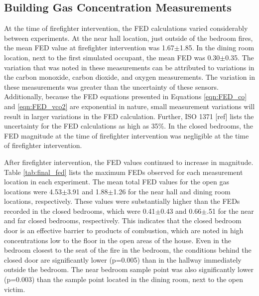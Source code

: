 \documentclass[12pt,oneside]{article}
\begin{document}
\subsection{Building Gas Concentration Measurements}
\label{subsec:gas}
At the time of firefighter intervention, the FED calculations varied considerably between experiments. At the near hall location, just outside of the bedroom fires,  the mean FED value at firefighter intervention was 1.67$\pm$1.85. In the dining room location, next to the first simulated occupant, the mean FED was 0.30$\pm$0.35. The variation that was noted in these measurements can be attributed to variations in the carbon monoxide, carbon dioxide, and oxygen measurements. The variation in these measurements was greater than the uncertainty of these sensors. Additionally, because the FED equations presented in Equations \ref{eqn:FED_co} and \ref{eqn:FED_vco2} are exponential in nature, small measurement variations will result in larger variations in the FED calculation. Further, ISO 1371 [ref] lists the uncertainty for the FED calculations as high as 35\%. In the closed bedrooms, the FED magnitude at the time of firefighter intervention was negligible at the time of firefighter intervention. 

After firefighter intervention, the FED values continued to increase in magnitude. Table \ref{tab:final_fed} lists the maximum FEDs observed for each measurement location in each experiment. The mean total FED values for the open gas locations were 4.53$\pm$3.91 and 1.88$\pm$1.26 for the near hall and dining room locations, respectively. These values were substantially higher than the FEDs recorded in the closed bedrooms, which were 0.41$\pm$0.43 and 0.66$\pm$.51 for the near and far closed bedrooms, respectively. This indicates that the closed bedroom door is an effective barrier to products of combustion, which are noted in high concentrations low to the floor in the open areas of the house. Even in the bedroom closest to the seat of the fire in the bedroom, the conditions behind the closed door are significantly lower (p=0.005) than in the hallway immediately outside the bedroom. The near bedroom sample point was also significantly lower (p=0.003) than the sample point located in the dining room, next to the open victim.
\end{document}
